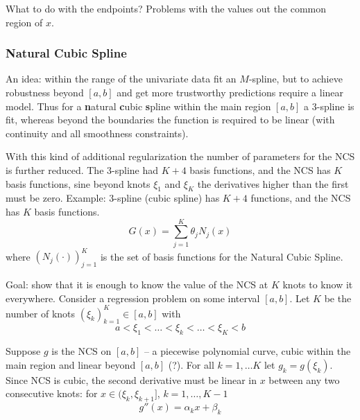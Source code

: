 \documentclass[a4paper]{article}
\begin{document}
What to do with the endpoints? Problems with the values out the common region of $x$.

\subsubsection{Natural Cubic Spline} %
\label{ssub:natural_cubic_spline}
An idea: within the range of the univariate data fit an $M$-spline, but to achieve
robustness beyond $[a,b]$ and get more trustworthy predictions require a linear
model. Thus for a \textbf{n}atural \textbf{c}ubic \textbf{s}pline within the main
region $[a,b]$ a $3$-spline is fit, whereas beyond the boundaries the function is
required to be linear (with continuity and all smoothness constraints).

With this kind of additional regularization the number of parameters for the NCS
is further reduced. The $3$-spline had $K+4$ basis functions, and the NCS has $K$
basis functions, sine beyond knots $\xi_1$ and $\xi_K$ the derivatives higher than
the first must be zero. Example: $3$-spline (cubic spline) has $K+4$ functions,
and the NCS has $K$ basis functions.
\[G(x) = \sum_{j=1}^K \theta_j N_j(x)\]
where $(N_j(\cdot))_{j=1}^K$ is the set of basis functions for the Natural Cubic
Spline.

Goal: show that it is enough to know the value of the NCS at $K$ knots to know it
everywhere. Consider a regression problem on some interval $[a,b]$. Let $K$ be the
number of knots $(\xi_k)_{k=1}^K\in [a,b]$ with
\[a < \xi_1<\ldots<\xi_k<\ldots<\xi_K<b\]

Suppose $g$ is the NCS on $[a,b]$ -- a piecewise polynomial curve, cubic within
the main region and linear beyond $[a,b]$ (?). For all $k=1,\ldots K$ let
$g_k = g(\xi_k)$.
Since NCS is cubic, the second derivative must be linear in $x$ between any two
consecutive knots: for $x\in (\xi_k,\xi_{k+1}]$, $k=1,\ldots, K-1$
\[g''(x) = \alpha_k x + \beta_k\]
\end{document}

